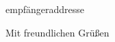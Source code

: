 \documentclass[fromphone,fromemail,fromrule=afteraddress]{scrlttr2}
\begin{document}
\pagestyle{headings} %

\begin{letter}{empfängeraddresse}

\opening{}
\closing{Mit freundlichen Grüßen}

\end{letter}
\end{document}
